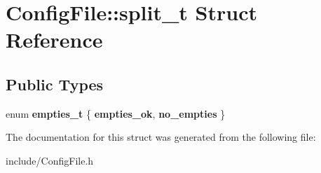 \hypertarget{structConfigFile_1_1split__t}{\section{Config\+File\+:\+:split\+\_\+t Struct Reference}
\label{structConfigFile_1_1split__t}
}
\subsection*{Public Types}
\begin{DoxyCompactItemize}
\item 
\hypertarget{structConfigFile_1_1split__t_a1e55e44eb3c3693f1a2008115b5aa1e6}{enum {\bfseries empties\+\_\+t} \{ {\bfseries empties\+\_\+ok}, 
{\bfseries no\+\_\+empties}
 \}}\label{structConfigFile_1_1split__t_a1e55e44eb3c3693f1a2008115b5aa1e6}

\end{DoxyCompactItemize}


The documentation for this struct was generated from the following file\+:\begin{DoxyCompactItemize}
\item 
include/Config\+File.\+h\end{DoxyCompactItemize}
